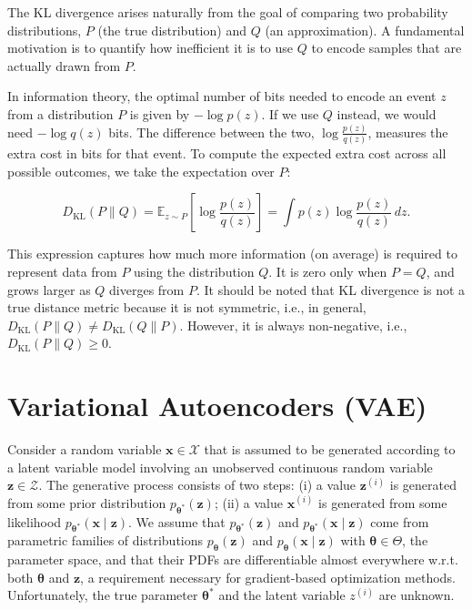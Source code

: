 \documentclass[10pt,twocolumn,article]{memoir}
\begin{document}
The KL divergence arises naturally from the goal of comparing two probability distributions, $P$ (the true distribution) and $Q$ (an approximation). A fundamental motivation is to quantify how inefficient it is to use $Q$ to encode samples that are actually drawn from $P$.

In information theory, the optimal number of bits needed to encode an event $z$ from a distribution $P$ is given by $-\log p(z)$. If we use $Q$ instead, we would need $-\log q(z)$ bits. The difference between the two, $\log \frac{p(z)}{q(z)}$, measures the extra cost in bits for that event. To compute the expected extra cost across all possible outcomes, we take the expectation over $P$:

\begin{equation}
    D_{\mathrm{KL}}(P \| Q) = \mathbb{E}_{z \sim P} \left[ \log \frac{p(z)}{q(z)} \right] = \int p(z) \log \frac{p(z)}{q(z)} \, dz.
\end{equation}

This expression captures how much more information (on average) is required to represent data from $P$ using the distribution $Q$. It is zero only when $P = Q$, and grows larger as $Q$ diverges from $P$. It should be noted that KL divergence is not a true distance metric because it is not symmetric, i.e., in general, $D_{\mathrm{KL}}(P \| Q) \neq D_{\mathrm{KL}}(Q \| P)$. However, it is always non-negative, i.e., $D_{\mathrm{KL}}(P \| Q) \geq 0$.

\section{Variational Autoencoders (VAE)}

Consider a random variable $\mathbf{x} \in \mathcal{X}$ that is assumed to be generated according to a latent variable model involving an unobserved continuous random variable $\mathbf{z} \in \mathcal{Z}$. The generative process consists of two steps: (i) a value $\mathbf{z}^{(i)}$ is generated from some prior distribution $p_{\boldsymbol{\theta^*}}(\mathbf{z})$; (ii) a value $\mathbf{x}^{(i)}$ is generated from some likelihood $p_{\boldsymbol{\theta^*}}(\mathbf{x} \mid \mathbf{z})$. We assume that $p_{\boldsymbol{\theta^*}}(\mathbf{z})$ and $p_{\boldsymbol{\theta^*}}(\mathbf{x} \mid \mathbf{z})$ come from parametric families of distributions $p_{\boldsymbol{\theta}}(\mathbf{z})$ and $p_{\boldsymbol{\theta}}(\mathbf{x} \mid \mathbf{z})$ with $\boldsymbol{\theta} \in \Theta$, the parameter space, and that their PDFs are differentiable almost everywhere w.r.t. both $\boldsymbol{\theta}$ and $\mathbf{z}$, a requirement necessary for gradient-based optimization methods. Unfortunately, the true parameter $\boldsymbol{\theta}^*$ and the latent variable $z^{(i)}$ are unknown.
\end{document}
